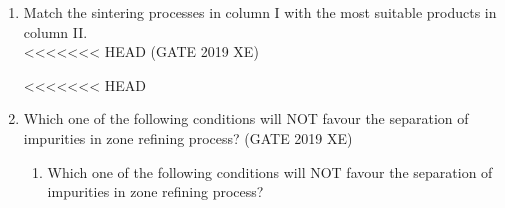 \documentclass[journal,12pt,onecolumn]{IEEEtran}
\begin{document}
\begin{enumerate}
\begin{multicols}{2}
<<<<<<< HEAD
\end{multicols}
=======

\newpage
>>>>>>> d734831 (Assignment)

\item Match the sintering processes in column I with the most suitable products in column II.\\



<<<<<<< HEAD
\hfill{(GATE 2019 XE)} \\
\begin{multicols}{2}
<<<<<<< HEAD
\end{multicols}

\item Which one of the following conditions will NOT favour the separation of impurities in zone refining process?
\hfill{(GATE 2019 XE)} \\
\begin{multicols}{2}
\begin{enumerate}
=======

\vspace{0.5cm}

\item Which one of the following conditions will NOT favour the separation of impurities in zone refining process?
\hfill{} \\


\end{enumerate}
\end{multicols}
\end{enumerate}
\end{document}
